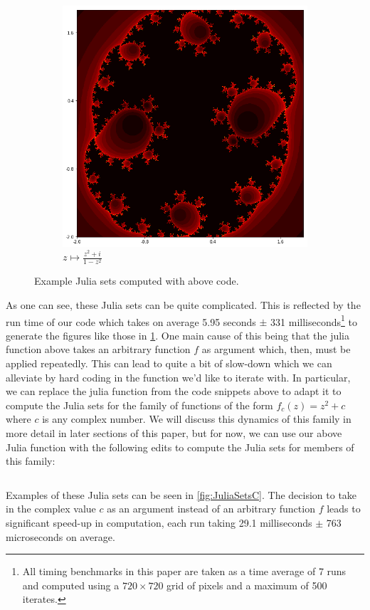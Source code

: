 \documentclass{amsart}
\theoremstyle{definition}
\theoremstyle{remark}
\numberwithin{equation}{section}
\begin{document}
\begin{figure}[h]
\begin{subfigure}{.32\textwidth}
  \includegraphics[width=.8\linewidth]{JuliaFunky.png}
  \caption{$z\mapsto \frac{z^2+i}{1-z^2}$}
\end{subfigure}
\caption{Example Julia sets computed with above code.}
\label{fig:JuliaSets}
\end{figure}

As one can see, these Julia sets can be quite complicated. This is reflected by the run time of our code which takes on average 5.95 seconds $\pm$ 331 milliseconds\footnote{All timing benchmarks in this paper are taken as a time average of 7 runs and computed using a $720\times 720$ grid of pixels and a maximum of 500 iterates.} to generate the figures like those in \cref{fig:JuliaSets}. One main cause of this being that the julia function above takes an arbitrary function $f$ as argument which, then, must be applied repeatedly. This can lead to quite a bit of slow-down which we can alleviate by hard coding in the function we'd like to iterate with. In particular, we can replace the julia function from the code snippets above to adapt it to compute the Julia sets for the family of functions of the form $f_c(z)=z^2+c$ where $c$ is any complex number. We will discuss this dynamics of this family in more detail in later sections of this paper, but for now, we can use our above Julia function with the following edits to compute the Julia sets for members of this family:
\inputminted[mathescape]{python}{code-snippets/Juliaquad.py}

Examples of these Julia sets can be seen in \cref{fig:JuliaSetsC}. The decision to take in the complex value $c$ as an argument instead of an arbitrary function $f$ leads to significant speed-up in computation, each run taking 29.1 milliseconds $\pm$ 763 microseconds on average.
\end{document}
